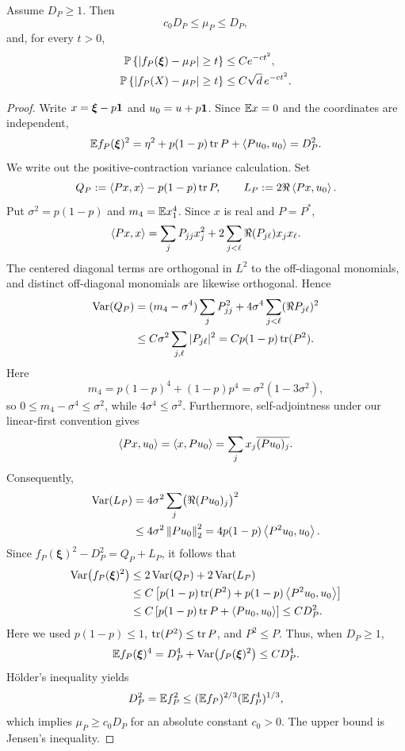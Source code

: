 \begin{lemma}\label{lem:regularized-distance}
Assume $D_P\ge1$. Then
\[
  c_0D_P\le\mu_P\le D_P,
\]
and, for every $t>0$,
\begin{align}
  \mathbb P\left\{|f_P(\boldsymbol\xi)-\mu_P|\ge t\right\}&\le Ce^{-ct^2},
  \label{eq:Bernoulli-distance-tail}\\
  \mathbb P\left\{|f_P(X)-\mu_P|\ge t\right\}&\le C\sqrt d\,e^{-ct^2}.
  \label{eq:slice-distance-tail}
\end{align}
\end{lemma}

\begin{proof}
Write $x=\boldsymbol\xi-p\mathbf 1$ and $u_0=u+p\mathbf 1$. Since $\mathbb E x=0$ and the coordinates are independent,
\[
  \mathbb E f_P(\boldsymbol\xi)^2
  =\eta^2+p(1-p)\operatorname{tr} P+\left\langle Pu_0,u_0\right\rangle
  =D_P^2.
\]
We write out the positive-contraction variance calculation. Set
\[
  Q_P:=\left\langle Px,x\right\rangle-p(1-p)\operatorname{tr} P,
  \qquad
  L_P:=2\Re\left\langle Px,u_0\right\rangle.
\]
Put $\sigma^2=p(1-p)$ and $m_4=\mathbb E x_1^4$. Since $x$ is real and $P=P^*$,
\[
  \left\langle Px,x\right\rangle
  =\sum_jP_{jj}x_j^2+2\sum_{j<\ell}\Re(P_{j\ell})x_jx_\ell.
\]
The centered diagonal terms are orthogonal in $L^2$ to the off-diagonal monomials, and distinct off-diagonal monomials are likewise orthogonal. Hence
\begin{align}
  \operatorname{Var}(Q_P)
  &=(m_4-\sigma^4)\sum_jP_{jj}^2
  +4\sigma^4\sum_{j<\ell}(\Re P_{j\ell})^2\notag\\
  &\le C\sigma^2\sum_{j,\ell}|P_{j\ell}|^2
  =Cp(1-p)\operatorname{tr}(P^2).
  \label{eq:QP-variance}
\end{align}
Here
\[
  m_4=p(1-p)^4+(1-p)p^4=\sigma^2(1-3\sigma^2),
\]
so $0\le m_4-\sigma^4\le\sigma^2$, while $4\sigma^4\le\sigma^2$. Furthermore, self-adjointness under our linear-first convention gives
\[
  \left\langle Px,u_0\right\rangle=\left\langle x,Pu_0\right\rangle
  =\sum_jx_j\overline{(Pu_0)_j}.
\]
Consequently,
\begin{align}
  \operatorname{Var}(L_P)
  &=4\sigma^2\sum_j\bigl(\Re(Pu_0)_j\bigr)^2\notag\\
  &\le4\sigma^2\left\|Pu_0\right\|_2^2
  =4p(1-p)\left\langle P^2u_0,u_0\right\rangle.
  \label{eq:LP-variance}
\end{align}
Since $f_P(\boldsymbol\xi)^2-D_P^2=Q_P+L_P$, it follows that
\begin{align*}
  \operatorname{Var}\bigl(f_P(\boldsymbol\xi)^2\bigr)
  &\le2\operatorname{Var}(Q_P)+2\operatorname{Var}(L_P)\\
  &\le C\left[p(1-p)\operatorname{tr}(P^2)+p(1-p)\left\langle P^2u_0,u_0\right\rangle\right]\\
  &\le C\left[p(1-p)\operatorname{tr} P+\left\langle Pu_0,u_0\right\rangle\right]
  \le CD_P^2.
\end{align*}
Here we used $p(1-p)\le1$, $\operatorname{tr}(P^2)\le\operatorname{tr} P$, and $P^2\le P$. Thus, when $D_P\ge1$,
\[
  \mathbb E f_P(\boldsymbol\xi)^4
  =D_P^4+\operatorname{Var}\bigl(f_P(\boldsymbol\xi)^2\bigr)
  \le CD_P^4.
\]
H\"older's inequality yields
\[
  D_P^2=\mathbb E f_P^2
  \le(\mathbb E f_P)^{2/3}(\mathbb E f_P^4)^{1/3},
\]
which implies $\mu_P\ge c_0D_P$ for an absolute constant $c_0>0$. The upper bound is Jensen's inequality.


\end{proof}
